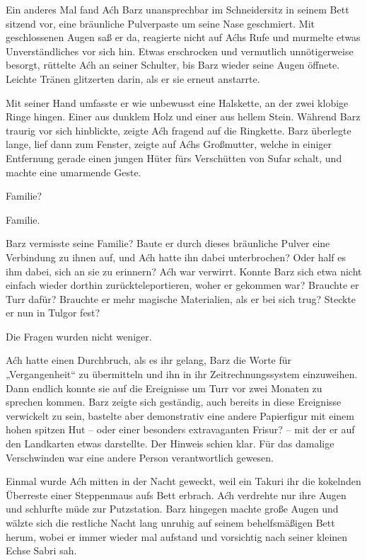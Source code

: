 Ein anderes Mal fand Aćh Barz unansprechbar im Schneidersitz in seinem Bett sitzend vor, eine bräunliche Pulverpaste um seine Nase geschmiert. Mit geschlossenen Augen saß er da, reagierte nicht auf Aćhs Rufe und murmelte etwas Unverständliches vor sich hin. Etwas erschrocken und vermutlich unnötigerweise besorgt, rüttelte Aćh an seiner Schulter, bis Barz wieder seine Augen öffnete. Leichte Tränen glitzerten darin, als er sie erneut anstarrte.

Mit seiner Hand umfasste er wie unbewusst eine Halskette, an der zwei klobige Ringe hingen. Einer aus dunklem Holz und einer aus hellem Stein. Während Barz traurig vor sich hinblickte, zeigte Aćh fragend auf die Ringkette. Barz überlegte lange, lief dann zum Fenster, zeigte auf Aćhs Großmutter, welche in einiger Entfernung gerade einen jungen Hüter fürs Verschütten von Sufar schalt, und machte eine umarmende Geste.

Familie?

Familie.

Barz vermisste seine Familie? Baute er durch dieses bräunliche Pulver eine Verbindung zu ihnen auf, und Aćh hatte ihn dabei unterbrochen? Oder half es ihm dabei, sich an sie zu erinnern? Aćh war verwirrt. Konnte Barz sich etwa nicht einfach wieder dorthin zurückteleportieren, woher er gekommen war? Brauchte er Turr dafür? Brauchte er mehr magische Materialien, als er bei sich trug? Steckte er nun in Tulgor fest?

Die Fragen wurden nicht weniger.

Aćh hatte einen Durchbruch, als es ihr gelang, Barz die Worte für „Vergangenheit“ zu übermitteln und ihn in ihr Zeitrechnungssystem einzuweihen. Dann endlich konnte sie auf die Ereignisse um Turr vor zwei Monaten zu sprechen kommen. Barz zeigte sich geständig, auch bereits in diese Ereignisse verwickelt zu sein, bastelte aber demonstrativ eine andere Papierfigur mit einem hohen spitzen Hut – oder einer besonders extravaganten Frisur? – mit der er auf den Landkarten etwas darstellte. Der Hinweis schien klar. Für das damalige Verschwinden war eine andere Person verantwortlich gewesen.

Einmal wurde Aćh mitten in der Nacht geweckt, weil ein Takuri ihr die kokelnden Überreste einer Steppenmaus aufs Bett erbrach. Aćh verdrehte nur ihre Augen und schlurfte müde zur Putzstation. Barz hingegen machte große Augen und wälzte sich die restliche Nacht lang unruhig auf seinem behelfsmäßigen Bett herum, wobei er immer wieder mal aufstand und vorsichtig nach seiner kleinen Echse Sabri sah.

